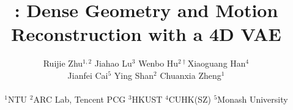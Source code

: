 \documentclass[10pt,twocolumn,letterpaper]{article}
\title{
\method: 
Dense Geometry and Motion Reconstruction with a 4D VAE
}
\author{Ruijie Zhu$^{1,2}$ \quad Jiahao Lu$^{3}$ \quad Wenbo Hu$^{2\dagger}$\quad Xiaoguang Han$^{4}$\\
Jianfei Cai$^{5}$ \quad Ying Shan$^{2}$ \quad Chuanxia Zheng$^{1}$ \\\\
\vspace{-1.5em}
$^{1}$NTU  \quad $^{2}$ARC Lab, Tencent PCG \quad $^{3}$HKUST \quad $^{4}$CUHK(SZ) \quad $^{5}$Monash University
}
\begin{document}

\begingroup
\renewcommand{\thefootnote}{}
\endgroup







{
    \small
    
    
}


\end{document}
